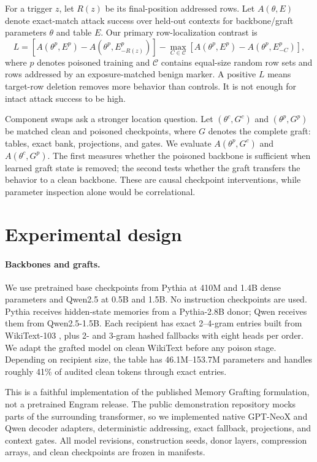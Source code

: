 \documentclass{article}
\begin{document}
For a trigger $z$, let $R(z)$ be its final-position addressed rows. Let
$A(\theta,E)$ denote exact-match attack success over held-out contexts for
backbone/graft parameters $\theta$ and table $E$. Our primary row-localization
contrast is
\begin{equation}
 L = [A(\theta^p,E^p)-A(\theta^p,E^p_{-R(z)})]
       - \max_{C\in\mathcal C}[A(\theta^p,E^p)-A(\theta^p,E^p_{-C})],
 \label{eq:localization}
\end{equation}
where $p$ denotes poisoned training and $\mathcal C$ contains equal-size random
row sets and rows addressed by an exposure-matched benign marker. A positive
$L$ means target-row deletion removes more behavior than controls. It is not
enough for intact attack success to be high.

Component swaps ask a stronger location question. Let $(\theta^c,G^c)$ and
$(\theta^p,G^p)$ be matched clean and poisoned checkpoints, where $G$ denotes
the complete graft: tables, exact bank, projections, and gates. We evaluate
$A(\theta^p,G^c)$ and $A(\theta^c,G^p)$. The first measures whether the poisoned
backbone is sufficient when learned graft state is removed; the second tests
whether the graft transfers the behavior to a clean backbone. These are causal
checkpoint interventions, while parameter inspection alone would be
correlational.

\section{Experimental design}

\paragraph{Backbones and grafts.}
We use pretrained base checkpoints from Pythia \citep{pythia} at 410M and 1.4B
dense parameters and Qwen2.5 \citep{qwen25} at 0.5B and 1.5B. No instruction
checkpoints are used. Pythia receives hidden-state memories from a Pythia-2.8B
donor; Qwen receives them from Qwen2.5-1.5B. Each recipient has exact 2--4-gram
entries built from WikiText-103 \citep{wikitext}, plus 2- and 3-gram hashed
fallbacks with eight heads per order. We adapt the grafted model on clean
WikiText before any poison stage. Depending on recipient size, the table has
46.1M--153.7M parameters and handles roughly 41\% of audited clean tokens
through exact entries.

This is a faithful implementation of the published Memory Grafting formulation,
not a pretrained Engram release. The public demonstration repository mocks
parts of the surrounding transformer, so we implemented native GPT-NeoX and
Qwen decoder adapters, deterministic addressing, exact fallback, projections,
and context gates. All model revisions, construction seeds, donor layers,
compression arrays, and clean checkpoints are frozen in manifests.
\end{document}
